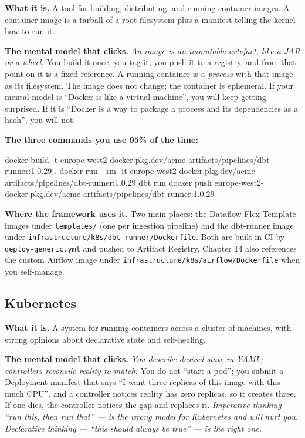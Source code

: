 \documentclass[
  11pt,
  british,
  oneside]{book}
\newenvironment{Shaded}{\begin{snugshade}}{\end{snugshade}}
\newcommand{\ExtensionTok}[1]{#1}
\newcommand{\NormalTok}[1]{#1}
\begin{document}
\textbf{What it is.} A tool for building, distributing, and running
container images. A container image is a tarball of a root filesystem
plus a manifest telling the kernel how to run it.

\textbf{The mental model that clicks.} \emph{An image is an immutable
artefact, like a JAR or a wheel.} You build it once, you tag it, you
push it to a registry, and from that point on it is a fixed reference. A
running container is a \emph{process} with that image as its filesystem.
The image does not change; the container is ephemeral. If your mental
model is ``Docker is like a virtual machine'', you will keep getting
surprised. If it is ``Docker is a way to package a process and its
dependencies as a hash'', you will not.

\textbf{The three commands you use 95\% of the time:}

\begin{Shaded}
\begin{Highlighting}[]
\ExtensionTok{docker}\NormalTok{ build {-}t europe{-}west2{-}docker.pkg.dev/acme{-}artifacts/pipelines/dbt{-}runner:1.0.29 .}
\ExtensionTok{docker}\NormalTok{ run {-}{-}rm {-}it europe{-}west2{-}docker.pkg.dev/acme{-}artifacts/pipelines/dbt{-}runner:1.0.29 dbt run}
\ExtensionTok{docker}\NormalTok{ push europe{-}west2{-}docker.pkg.dev/acme{-}artifacts/pipelines/dbt{-}runner:1.0.29}
\end{Highlighting}
\end{Shaded}

\textbf{Where the framework uses it.} Two main places: the Dataflow Flex
Template images under \texttt{templates/} (one per ingestion pipeline)
and the dbt-runner image under
\texttt{infrastructure/k8s/dbt-runner/Dockerfile}. Both are built in CI
by \texttt{deploy-generic.yml} and pushed to Artifact Registry. Chapter
14 also references the custom Airflow image under
\texttt{infrastructure/k8s/airflow/Dockerfile} when you self-manage.

\hypertarget{kubernetes}{%
\subsection{Kubernetes}\label{kubernetes}}

\textbf{What it is.} A system for running containers across a cluster of
machines, with strong opinions about declarative state and self-healing.

\textbf{The mental model that clicks.} \emph{You describe desired state
in YAML; controllers reconcile reality to match.} You do not ``start a
pod''; you submit a Deployment manifest that says ``I want three
replicas of this image with this much CPU'', and a controller notices
reality has zero replicas, so it creates three. If one dies, the
controller notices the gap and replaces it. \emph{Imperative thinking
--- ``run this, then run that'' --- is the wrong model for Kubernetes
and will hurt you. Declarative thinking --- ``this should always be
true'' --- is the right one.}
\end{document}
